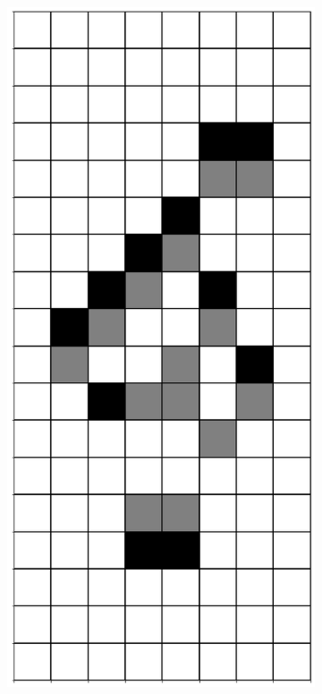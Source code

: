 \documentclass[12pt]{article}
\numberwithin{figure}{section} %
\begin{document}
\begin{figure}[H]
\begin{subfigure}{0.19\textwidth}
     		\subcaption{}
   	\end{subfigure}
        	\begin{subfigure}{0.19\textwidth}
     		\centering
     		\includegraphics[width=\linewidth]{Section4/27.2}

\end{subfigure}
\end{figure}
\end{document}
